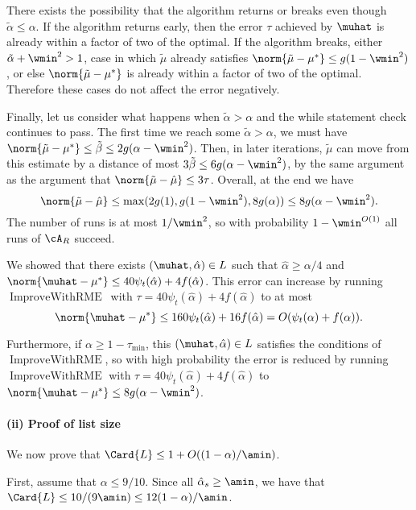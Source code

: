 There exists the possibility that the algorithm returns or breaks even though $\tilde\alpha \leq \alpha$.
If the algorithm returns early, then the error $\tau$ achieved by $\muhat$ is already within a factor of two of the optimal.
If the algorithm breaks, either $\tilde{\alpha} + \wmin^2 > 1$, case in which $\tilde{\mu}$ already satisfies $\norm{\tilde{\mu} - \mu^*} \leq g(1-\wmin^2)$, or else $\norm{\tilde{\mu} - \mu^*}$ is already within a factor of two of the optimal.
Therefore these cases do not affect the error negatively.

Finally, let us consider what happens when $\tilde\alpha > \alpha$ and the while statement check continues to pass.
The first time we reach some $\tilde\alpha > \alpha$, we must have $\norm{\tilde\mu - \mu^*} \leq \tilde\beta \leq 2g(\alpha - \wmin^2)$.
Then, in later iterations, $\tilde\mu$ can move from this estimate by a distance of most $3\tilde\beta \leq 6g(\alpha - \wmin^2)$, by the same argument as the argument that $\norm{\tilde\mu-\hat\mu} \leq 3\tau$. Overall, at the end we have \[\norm{\tilde\mu-\hat\mu} \leq \max(2g(1), g(1-\wmin^2), 8g(\alpha)) \leq 8g(\alpha-\wmin^2).\] The number of runs is at most $1/\wmin^2$, so with probability $1-\wmin^{O(1)}$ all runs of $\cA_{R}$ succeed.

We showed that there exists \((\muhat, \hat \alpha) \in L\) such that \(\hat \alpha \geq \alpha / 4\) and $\norm{\muhat - \mu^{\ast}} \leq 40 \psi_t(\hat\alpha) + 4f(\hat\alpha)$.
This error can increase by running~\(\operatorname{ImproveWithRME}\)~with $\tau=40 \psi_t(\hat\alpha) + 4f(\hat\alpha)$ to at most \[\norm{\muhat - \mu^{\ast}} \leq 160 \psi_t(\hat\alpha) + 16f(\hat\alpha) = O(\psi_t(\alpha) + f(\alpha)).\] 

Furthermore, if \(\alpha \geq 1-\tau_{\min}\),
this \((\muhat, \hat \alpha) \in L\) satisfies the conditions of~\(\operatorname{ImproveWithRME}\), so with high probability the error is reduced by running~\(\operatorname{ImproveWithRME}\) with $\tau=40 \psi_t(\hat\alpha) + 4f(\hat\alpha)$ to $\norm{\muhat-\mu^{\ast}} \leq 8g(\alpha-\wmin^2)$.
\paragraph{(ii) Proof of list size} We now prove that \(\Card{L} \leq  1 + O((1 - \alpha) / \amin)\).

First, assume that \(\alpha \leq 9/10\).
Since all $\hat\alpha_s \geq \amin$, we have that \(\Card{L} \leq 10 / (9\amin) \leq 12 (1 - \alpha) / \amin\).

